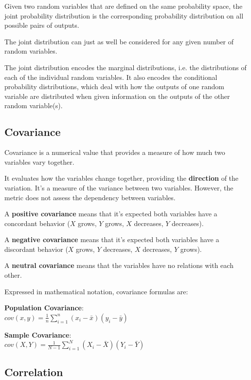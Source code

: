 \documentclass{article}
\begin{document}
Given two random variables that are defined on the same probability space, the joint probability distribution is the corresponding probability distribution on all possible pairs of outputs. 

The joint distribution can just as well be considered for any given number of random variables. 

The joint distribution encodes the marginal distributions, i.e. the distributions of each of the individual random variables. It also encodes the conditional probability distributions, which deal with how the outputs of one random variable are distributed when given information on the outputs of the other random variable(s).

\subsection{Covariance}
Covariance is a numerical value that provides a measure of how much two variables vary together.

It evaluates how the variables change together, providing the \textbf{direction} of the variation. 
It’s a measure of the variance between two variables. However, the metric does not assess the dependency between variables.

A \textbf{positive covariance} means that it’s expected both variables have a concordant behavior ($X$ grows, $Y$ grows, $X$ decreases, $Y$ decreases).

A \textbf{negative covariance} means that it’s expected both variables have a discordant behavior 
($X$ grows, $Y$ decreases, $X$ decreases, $Y$ grows).

A \textbf{neutral covariance} means that the variables have no relations with each other.

Expressed in mathematical notation, covariance formulas are:

\textbf{Population Covariance}: \\ 
$\displaystyle cov(x, y) = \frac{1}{n}\sum \limits_{i=1}^n (x_i - \bar{x})(y_i - \bar{y})$

\textbf{Sample Covariance}: \\ 
$\displaystyle cov(X, Y) = \frac{1}{N-1}\sum \limits_{i=1}^N (X_i - \bar{X})(Y_i - \bar{Y})$

\subsection{Correlation}
\end{document}
